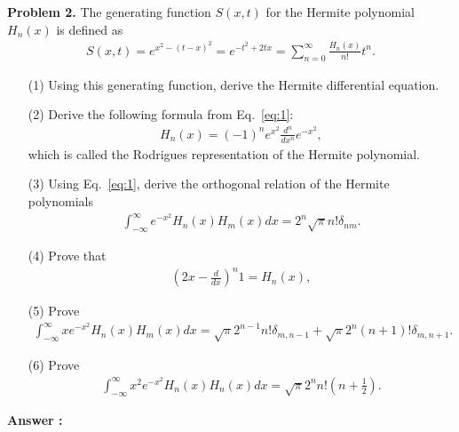 \documentclass[floatfix,nofootinbib,superscriptaddress,fleqn]{revtex4-2}
\begin{document}
\vspace{0.5cm}
\newpage
\noindent \textbf{Problem 2.} 
The generating function $S(x,t)$ for the Hermite polynomial $H_n(x)$
is defined as 
\begin{align}
S(x,t) = e^{x^2-(t-x)^2} = e^{-t^2 + 2 t x} 
= \sum_{n=0}^\infty
  \frac{H_n(x)}{n!} t^n.  
\label{eq:1}
\end{align}
\begin{itemize}
\item[(1)] Using this generating function, derive the Hermite
  differential equation. 
\item[(2)] Derive the following formula from Eq.~\eqref{eq:1}:
  \begin{align}\label{eq:2-0-1}
H_n(x) = (-1)^n e^{x^2} \frac{d^n}{dx^n} e^{-x^2}    ,
  \end{align}
which is called the Rodrigues representation of the Hermite
polynomial. 
\item[(3)] Using Eq.~\eqref{eq:1}, derive the orthogonal relation of
  the Hermite polynomials
  \begin{align}\label{eq:2-0-2}
    \int_{-\infty}^\infty e^{-x^2} H_n(x) H_m(x) dx 
    = 2^n \sqrt{\pi}
    n! \delta_{nm}.
  \end{align}
\item[(4)] Prove that
  \begin{align}\label{eq:2-0-3}
    \left(2x-\frac{d}{dx}\right)^n 1 = H_n(x),
  \end{align}
\item[(5)] Prove
  \begin{align}\label{eq:2-0-4}
    \int_{-\infty}^\infty x e^{-x^2} H_n(x) H_m(x) dx 
    = \sqrt{\pi}
    2^{n-1} n!\delta_{m,n-1} 
    + \sqrt{\pi} 2^n (n+1)! \delta_{m,n+1}.
  \end{align}
\item[(6)] Prove
  \begin{align}\label{eq:2}
    \int_{-\infty}^\infty x^2 e^{-x^2} H_n(x) H_n(x) dx = 
\sqrt{\pi} 2^n n! \left(n+\frac12\right).
  \end{align}
\end{itemize}

\noindent \textbf{Answer : }
\end{document}

